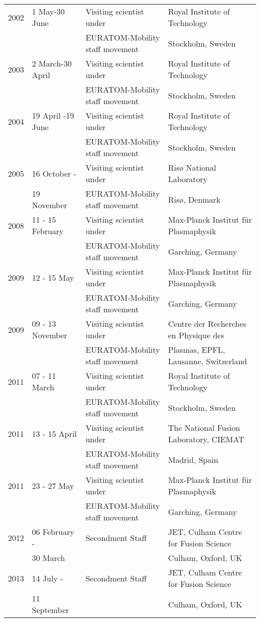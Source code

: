 {\begin{longtable}{llll}
2002 & 1 May-30 June & Visiting scientist under& Royal Institute of
Technology\\
 & & EURATOM-Mobility
staff movement &  Stockholm, Sweden \\
2003 & 2 March-30 April & Visiting scientist under& Royal Institute of
Technology\\
 & & EURATOM-Mobility
staff movement &  Stockholm, Sweden \\
2004 & 19 April -19 June & Visiting scientist under& Royal Institute of
Technology\\
 & & EURATOM-Mobility
staff movement &  Stockholm, Sweden \\
2005 & 16 October - & Visiting scientist under& Ris{\o}
National Laboratory\\
 & 19 November & EURATOM-Mobility
staff movement &  Ris{\o}, Denmark \\
2008 & 11 - 15 February & Visiting scientist under& Max-Planck
Institut f\"ur Plasmaphysik \\
 & & EURATOM-Mobility
staff movement &  Garching, Germany \\
2009 & 12 - 15 May & Visiting scientist under& Max-Planck
Institut f\"ur Plasmaphysik \\
 & & EURATOM-Mobility
staff movement &  Garching, Germany \\
2009 & 09 - 13 November & Visiting scientist under& Centre der
Recherches en Physique des \\
 & & EURATOM-Mobility
staff movement & Plasmas, EPFL, Lausanne, Switzerland \\
2011 & 07 - 11 March & Visiting scientist under& Royal Institute of
Technology\\
 & & EURATOM-Mobility
staff movement &  Stockholm, Sweden \\
2011 & 13 - 15 April & Visiting scientist under& The National Fusion
Laboratory, CIEMAT \\
 & & EURATOM-Mobility
staff movement &  Madrid, Spain \\
2011 & 23 - 27 May & Visiting scientist under& Max-Planck
Institut f\"ur Plasmaphysik \\
 & & EURATOM-Mobility
staff movement &  Garching, Germany \\
2012 & 06 February -  & Secondment Staff & JET, Culham Centre for
Fusion Science \\
 & 30 March & &  Culham, Oxford, UK \\
2013 & 14 July -  & Secondment Staff & JET, Culham Centre for
Fusion Science \\
 & 11 September & &  Culham, Oxford, UK \\
\end{longtable}
}
